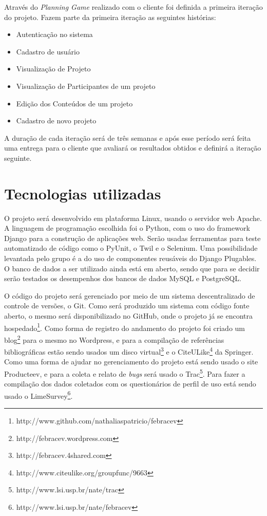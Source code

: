     Através do \textit{Planning Game} realizado com o cliente foi definida a primeira iteração do projeto. Fazem parte da primeira iteração as seguintes histórias:

    \begin{itemize}
      \item Autenticação no sistema
      \item Cadastro de usuário
      \item Visualização de Projeto
      \item Visualização de Participantes de um projeto
      \item Edição dos Conteúdos de um projeto
      \item Cadastro de novo projeto
    \end{itemize}

    A duração de cada iteração será de três semanas e após esse período será feita uma entrega para o cliente que avaliará os resultados obtidos e definirá a iteração seguinte.

\section{Tecnologias utilizadas}

  O projeto será desenvolvido em plataforma Linux, usando o servidor web Apache. A linguagem de programação escolhida foi o Python, com o uso do framework Django para a construção de aplicações web. Serão usadas ferramentas para teste automatizado de código como o PyUnit, o Twil e o Selenium. Uma possibilidade levantada pelo grupo é a do uso de componentes reusáveis do Django Plugables. O banco de dados a ser utilizado ainda está em aberto, sendo que para se decidir serão testados os desempenhos dos bancos de dados MySQL e PostgreSQL.

  O código do projeto será gerenciado por meio de um sistema descentralizado de controle de versões, o Git. Como será produzido um sistema com código fonte aberto, o mesmo será disponibilizado no GitHub, onde o projeto já se encontra hospedado\footnote{http://www.github.com/nathaliaspatricio/febracev}. Como forma de registro do andamento do projeto foi criado um blog\footnote{http://febracev.wordpress.com} para o mesmo no Wordpress, e para a compilação de referências bibliográficas estão sendo usados um disco virtual\footnote{http://febracev.4shared.com} e o CiteULike\footnote{http://www.citeulike.org/groupfunc/9663} da Springer. Como uma forma de ajudar no gerenciamento do projeto está sendo usado o site Producteev, e para a coleta e relato de \textit{bugs} será usado o Trac\footnote{http://www.lsi.usp.br/nate/trac}. Para fazer a compilação dos dados coletados com os questionários de perfil de uso está sendo usado o LimeSurvey\footnote{http://www.lsi.usp.br/nate/febracev}.

